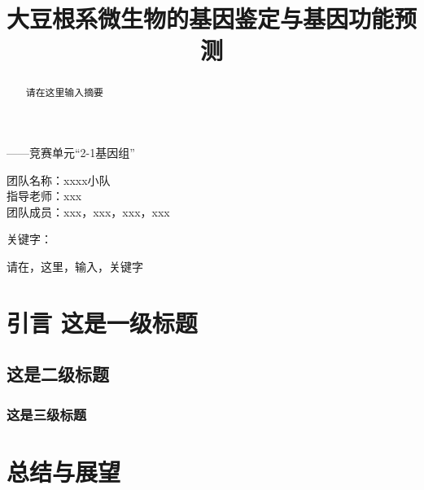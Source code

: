 \documentclass[UTF8]{ctexart}
\author{}
\date{}
\title{\vspace*{-1.5cm} \CJKfontspec{SimHei}大豆根系微生物的基因鉴定与基因功能预测}
\begin{document}
    \maketitle\thispagestyle{fancy}
    \vspace*{-1.5cm}

    \begin{flushright}
        { \heiti  ——竞赛单元“2-1基因组”}

        \vspace*{\baselineskip} 

        团队名称：xxxx小队 \\
        指导老师：xxx \\
        团队成员：xxx，xxx，xxx，xxx \\
    \end{flushright}


    \begin{abstract}
        请在这里输入摘要\textsuperscript{\cite{ref1}}\lipsum
    \end{abstract}
    

    {\heiti {} \raggedright 关键字：} { 请在，这里，输入，关键字}


    \section{引言 这是一级标题}

    \subsection{这是二级标题}

    \subsubsection{这是三级标题}

    \lipsum






    \section{总结与展望}

    \lipsum

    \begin{thebibliography}{0}
         \lipsum[1]

         \lipsum[1]

        

    \end{thebibliography}
\end{document}
